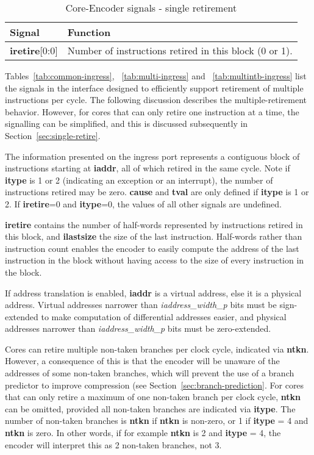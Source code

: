 \begin{table}[htp]
    \centering
    \caption{Core-Encoder signals - single retirement}
    \label{tab:single-ingress}
    \begin{tabulary}{\textwidth}{|l|p{80mm}|}
        \hline
        \textbf {Signal} & \textbf {Function} \\
        \hline
        \textbf{iretire}[0:0] & Number of instructions retired in this block (0 or 1).\\
        \hline
    \end{tabulary}
\end{table}

Tables~\ref{tab:common-ingress}, ~\ref{tab:multi-ingress} and ~\ref{tab:multintb-ingress}
list the signals in the interface designed to efficiently support retirement of multiple 
instructions per cycle.  The following discussion describes the multiple-retirement behavior.  
However, for cores that can only retire one instruction at a time, the signalling can be 
simplified, and this is discussed subsequently in Section~\ref{sec:single-retire}.  

The information presented on the ingress port represents a contiguous
block of instructions starting at \textbf{iaddr}, all of which retired
in the same cycle. Note if \textbf{itype} is 1 or 2 (indicating an
exception or an interrupt), the number of instructions retired may be
zero. \textbf{cause} and \textbf{tval} are only defined if
\textbf{itype} is 1 or 2. If \textbf{iretire}=0 and \textbf{itype}=0,
the values of all other signals are undefined.

\textbf{iretire} contains the number of half-words represented by
instructions retired in this block, and \textbf{ilastsize} the size of the last
instruction.  Half-words rather than instruction count enables the encoder to easily compute the address of
the last instruction in the block without having access to the size of every 
instruction in the block.  

If address translation is enabled, \textbf{iaddr} is a virtual
address, else it is a physical address. Virtual addresses narrower
than \textit{iaddress\_width\_p} bits must be sign-extended to make
computation of differential addresses easier, and physical addresses
narrower than \textit{iaddress\_width\_p} bits must be zero-extended.

Cores can retire multiple non-taken branches per clock cycle, indicated via \textbf{ntkn}.
However, a consequence of this is that the encoder will be unaware of the addresses of some non-taken branches, 
which will prevent the use of a branch predictor to improve compression (see Section~\ref{sec:branch-prediction}.
For cores that can only retire a maximum of one non-taken branch per clock cycle,
\textbf{ntkn} can be omitted, provided all non-taken branches are indicated via \textbf{itype}.  
The number of non-taken branches is \textbf{ntkn} if \textbf{ntkn} is non-zero, or 1 if \textbf{itype} = 4 and \textbf{ntkn} is zero.
In other words, if for example \textbf{ntkn} is 2 and \textbf{itype} = 4, the encoder will interpret this as 2 non-taken branches,
not 3.

